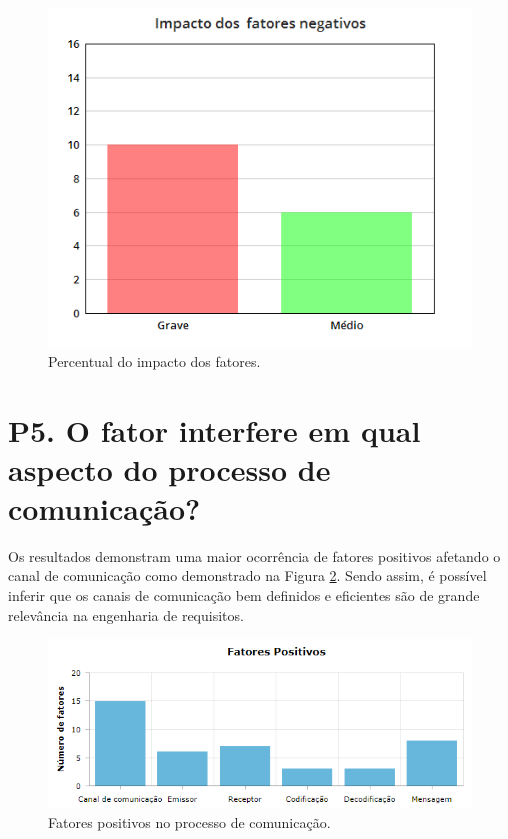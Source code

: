 \begin{figure}[h!] %
	\caption{Percentual do impacto dos fatores.}
	\begin{center}
	    \includegraphics[scale=0.5]{figuras/impact.png} %
	\end{center}
	\label{fig:grafimpact}
\end{figure}

\section{P5. O fator interfere em qual aspecto do processo de comunicação?}

Os resultados demonstram uma maior ocorrência de fatores positivos afetando o canal de comunicação como demonstrado na Figura \ref{fig:graf}. Sendo assim, é possível inferir que os canais de comunicação bem definidos e eficientes são de grande relevância na engenharia de requisitos. 

\newpage
   \begin{figure}[h!] %
    \caption{Fatores positivos no processo de comunicação.}
	\begin{center}
	    \includegraphics[scale=0.9]{figuras/graftcc} %
	\end{center}
	\label{fig:graf}
\end{figure}

